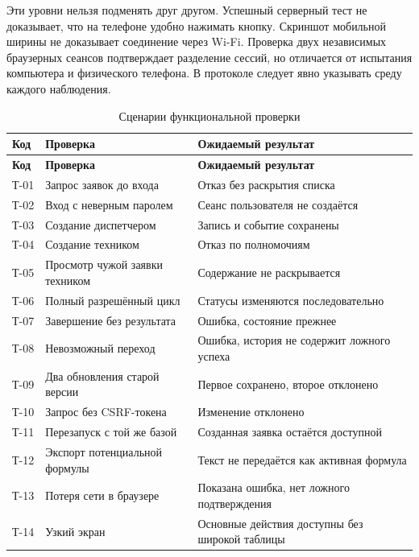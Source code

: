 \documentclass{timcw}
\begin{document}
Эти уровни нельзя подменять друг другом. Успешный серверный тест не доказывает, что на телефоне удобно нажимать кнопку. Скриншот мобильной ширины не доказывает соединение через Wi-Fi. Проверка двух независимых браузерных сеансов подтверждает разделение сессий, но отличается от испытания компьютера и физического телефона. В протоколе следует явно указывать среду каждого наблюдения.

\begingroup\small\singlespacing
\begin{longtable}{>{\raggedright\arraybackslash}p{}>{\raggedright\arraybackslash}p{}>{\raggedright\arraybackslash}p{}}
\caption{Сценарии функциональной проверки}\\
\hline
\textbf{Код} & \textbf{Проверка} & \textbf{Ожидаемый результат} \\ \hline
\endfirsthead
\textbf{Код} & \textbf{Проверка} & \textbf{Ожидаемый результат} \\ \hline
\endhead
Т-01 & Запрос заявок до входа & Отказ без раскрытия списка \\ \hline
Т-02 & Вход с неверным паролем & Сеанс пользователя не создаётся \\ \hline
Т-03 & Создание диспетчером & Запись и событие сохранены \\ \hline
Т-04 & Создание техником & Отказ по полномочиям \\ \hline
Т-05 & Просмотр чужой заявки техником & Содержание не раскрывается \\ \hline
Т-06 & Полный разрешённый цикл & Статусы изменяются последовательно \\ \hline
Т-07 & Завершение без результата & Ошибка, состояние прежнее \\ \hline
Т-08 & Невозможный переход & Ошибка, история не содержит ложного успеха \\ \hline
Т-09 & Два обновления старой версии & Первое сохранено, второе отклонено \\ \hline
Т-10 & Запрос без CSRF-токена & Изменение отклонено \\ \hline
Т-11 & Перезапуск с той же базой & Созданная заявка остаётся доступной \\ \hline
Т-12 & Экспорт потенциальной формулы & Текст не передаётся как активная формула \\ \hline
Т-13 & Потеря сети в браузере & Показана ошибка, нет ложного подтверждения \\ \hline
Т-14 & Узкий экран & Основные действия доступны без широкой таблицы \\ \hline
\end{longtable}
\endgroup
\end{document}
